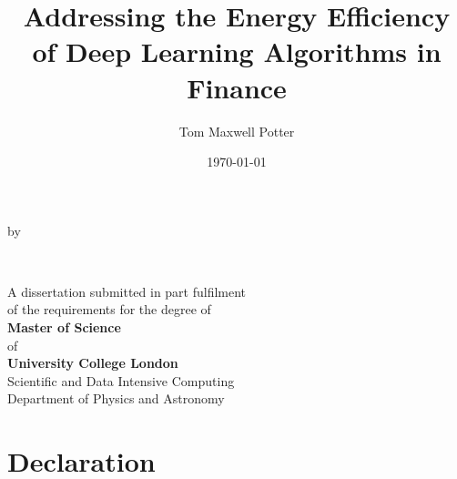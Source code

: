 \documentclass[a4paper, 11pt]{report}
\title{Addressing the Energy Efficiency of Deep Learning Algorithms in Finance}
\author{Tom Maxwell Potter}
\date{\today}
\begin{document}
    \begin{titlepage}
        \begin{center}
            \vspace*{1cm}
            
            \vfill
            
            \makeatletter
            {\Huge\textbf{\@title}}

            \vspace{0.8cm}
            by
            \vspace{0.8cm}

            {\Large\textbf{\@author}}

            \vspace{1.5cm}
            {\textbf{\\\@date}}

            \vfill

            {A dissertation submitted in part fulfilment\\
            of the requirements for the degree of\\}
            {
            \textbf{Master of Science}\\
            of\\
            \textbf{University College London\\}}
            \vspace{1cm}
            {Scientific and Data Intensive Computing\\
            Department of Physics and Astronomy}

            \vspace{2cm}
        \end{center}
    \end{titlepage}


    \chapter*{Declaration}
    
\end{document}
